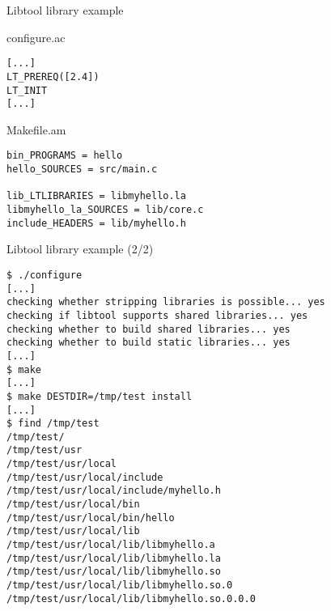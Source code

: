 \begin{frame}[fragile]{Libtool library example}

\begin{block}{configure.ac}
\begin{verbatim}
[...]
LT_PREREQ([2.4])
LT_INIT
[...]
\end{verbatim}
\end{block}

\begin{block}{Makefile.am}
\begin{verbatim}
bin_PROGRAMS = hello
hello_SOURCES = src/main.c

lib_LTLIBRARIES = libmyhello.la
libmyhello_la_SOURCES = lib/core.c
include_HEADERS = lib/myhello.h
\end{verbatim}
\end{block}

\end{frame}

\begin{frame}[fragile]{Libtool library example (2/2)}

\begin{block}{}
\begin{verbatim}
$ ./configure
[...]
checking whether stripping libraries is possible... yes
checking if libtool supports shared libraries... yes
checking whether to build shared libraries... yes
checking whether to build static libraries... yes
[...]
$ make
[...]
$ make DESTDIR=/tmp/test install
[...]
$ find /tmp/test
/tmp/test/
/tmp/test/usr
/tmp/test/usr/local
/tmp/test/usr/local/include
/tmp/test/usr/local/include/myhello.h
/tmp/test/usr/local/bin
/tmp/test/usr/local/bin/hello
/tmp/test/usr/local/lib
/tmp/test/usr/local/lib/libmyhello.a
/tmp/test/usr/local/lib/libmyhello.la
/tmp/test/usr/local/lib/libmyhello.so
/tmp/test/usr/local/lib/libmyhello.so.0
/tmp/test/usr/local/lib/libmyhello.so.0.0.0
\end{verbatim}
\end{block}

\end{frame}

